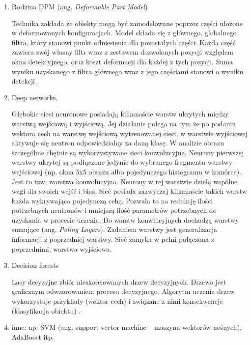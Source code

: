 \begin{enumerate}
\item Rodzina DPM (ang. \textit{Deformable Part Model}) 

Technika zakłada że obiekty mogą być zamodelowane poprzez części ułożone w deformowanych konfiguracjach. Model składa się z głównego, globalnego filtra, który stanowi punkt odniesienia dla pozostałych części. Każda część zawiera swój własny filtr wraz z zestawem dozwolonych pozycji względem okna detekcyjnego, oraz koszt deformacji dla każdej z tych pozycji. Suma wyniku uzyskanego z filtra głównego wraz z jego częściami stanowi o wyniku detekcji \cite{felzenszwalb2008discriminatively}.

\item Deep networks.

Głębokie sieci neuronowe posiadają kilkanaście warstw ukrytych między warstwą wejściową i wyjściową. Jej działanie polega na tym że po podaniu wektora cech na warstwę wejściową wytrenowanej sieci, w warstwie wyjściowej aktywuje się neutron odpowiedzialny za daną klasę. W analizie obrazu szczególnie chętnie są wykorzystywane sieci konwolucyjne. Neurony pierwszej warstwy ukrytej są podłączone jedynie do wybranego fragmentu warstwy wejściowej (np. okna 5x5 obrazu albo pojedynczego histogramu w komórce). Jest to tzw. warstwa konwolucyjna. Neurony w tej warstwie dzielą wspólne wagi dla swoich wejść i bias. Sieć posiada zazwyczaj kilkanaście takich warstw każda wykrywająca pojedynczą cehę. Pozwala to na redukcję ilości potrzebnych neutronów i mniejszą ilość parametrów potrzebnych do uzyskania w procesie uczenia. Do warstw konwlucyjnych dochodzą warstwy sumujące (ang. \textit{Poling Layers}). Zadaniem warstwy jest generalizacja informacji z poprzedniej warstwy. Sieć zamyka w pełni połączona z poprzednimi, warstwa wyjściowa.

\item Decision forests 

 Lasy decyzyjne zbiór nieskorelowanych drzew decyzyjnych. Drzewo jest graficznym odwzorowaniem procesu decyzyjnego. Algorytm uczenia drzew wykorzystuje przykłady (wektor cech) i związane z nimi konsekwencje (klasyfikacja obiektu) . 

\item inne:  np. SVM (ang. support vector machine – maszyna wektorów nośnych), AdaBoost itp. 


\end{enumerate}





